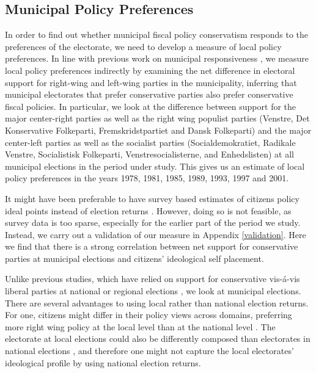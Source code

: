 \documentclass[a4paper,12pt]{article}
\begin{document}
\subsection*{Municipal Policy Preferences}

In order to find out whether municipal fiscal policy conservatism responds to the preferences of the electorate, we need to develop a measure of local policy preferences. In line with previous work on municipal responsiveness \cite[e.g.,][]{sances2017ideology,einstein2016pushing}, we measure local policy preferences indirectly by examining the net difference in electoral support for right-wing and left-wing parties in the municipality, inferring that municipal electorates that prefer conservative parties also prefer conservative fiscal policies. In particular, we look at the difference between support for the major center-right parties as well as the right wing populist parties (Venstre, Det Konservative Folkeparti, Fremskridstpartiet and Dansk Folkeparti) and the major center-left parties as well as the socialist parties (Socialdemokratiet, Radikale Venstre, Socialistisk Folkeparti, Venstresocialisterne, and Enhedslisten) at all municipal elections in the period under study. This gives us an estimate of local policy preferences in the years 1978, 1981, 1985, 1989, 1993, 1997 and 2001.

It might have been preferable to have survey based estimates of citizens policy ideal points instead of election returns \citep[similar to the measure used by][]{tausanovitch2014representation}. However, doing so is not feasible, as survey data is too sparse, especially for the earlier part of the period we study. Instead, we carry out a validation of our measure in Appendix \ref{validation}. Here we find that there is a strong correlation between net support for conservative parties at municipal elections and citizens' ideological self placement.

 Unlike previous studies, which have relied on support for conservative vis-á-vis liberal parties at national or regional elections \citep[e.g.,][]{hajnal2010or,einstein2016pushing}, we look at municipal elections. There are several advantages to using local rather than national election returns. For one, citizens might differ in their policy views across domains, preferring more right wing policy at the local level than at the national level \cite[for an argument along these lines, see][]{abrams2012big}. The electorate at local elections could also be differently composed than electorates in national elections \citep{bhatti2019core}, and therefore one might not capture the local electorates' ideological profile by using national election returns.
\end{document}
